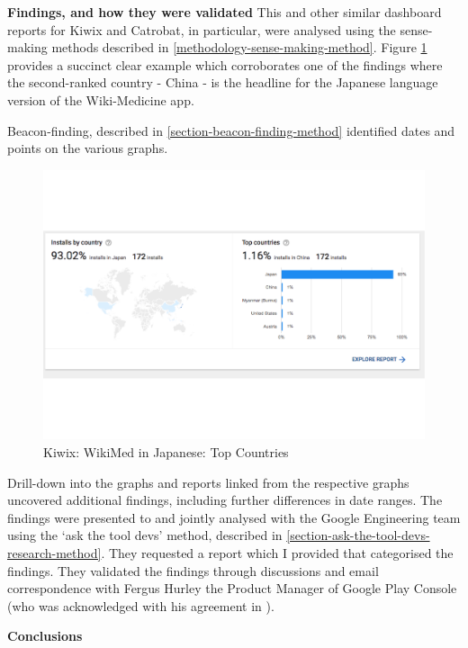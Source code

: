 \textbf{Findings, and how they were validated}
This and other similar dashboard reports for Kiwix and Catrobat, in particular, were analysed using the sense-making methods described in \ref{methodology-sense-making-method}. Figure \ref{fig:wikimed-japan-top-countries} provides a succinct clear example which corroborates one of the findings where the second-ranked country - China - is the headline for the Japanese language version of the Wiki-Medicine app. 

Beacon-finding, described in \ref{section-beacon-finding-method} identified dates and points on the various graphs. 

\begin{figure}
    \centering
    \includegraphics{images/android-vitals-screenshots/kiwix/wikimed-japan-top-countries.pdf}
    \caption{Kiwix: WikiMed in Japanese: Top Countries}
    \label{fig:wikimed-japan-top-countries}
\end{figure}

Drill-down into the graphs and reports linked from the respective graphs uncovered additional findings, including further differences in date ranges. The findings were presented to and jointly analysed with the Google Engineering team using the `ask the tool devs' method, described in \ref{section-ask-the-tool-devs-research-method}. They requested a report which I provided that categorised the findings. They validated the findings through discussions and email correspondence with Fergus Hurley the Product Manager of Google Play Console (who was acknowledged with his agreement in ).

\textbf{Conclusions}